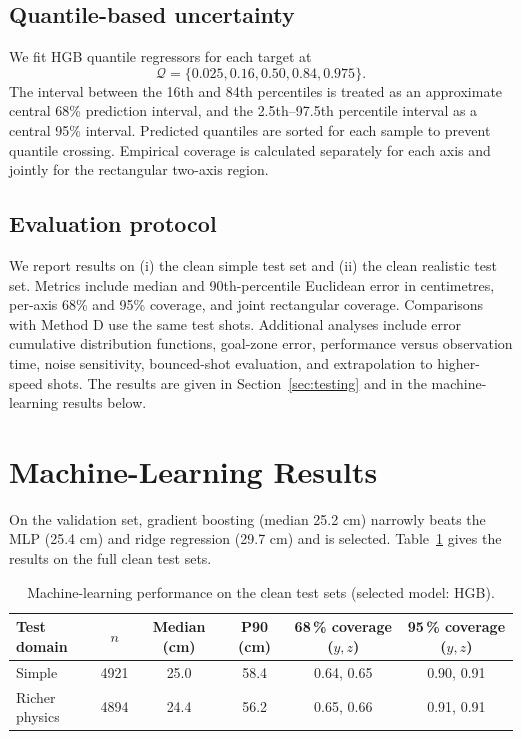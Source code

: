 \documentclass[11pt,a4paper]{article}
\begin{document}
\subsection{Quantile-based uncertainty}
We fit HGB quantile regressors for each target at
\begin{equation}
    \mathcal Q=\{0.025,0.16,0.50,0.84,0.975\}.
\end{equation}
The interval between the 16th and 84th percentiles is treated as an approximate central 68\% prediction interval, and the 2.5th--97.5th percentile interval as a central 95\% interval. Predicted quantiles are sorted for each sample to prevent quantile crossing. Empirical coverage is calculated separately for each axis and jointly for the rectangular two-axis region.

\subsection{Evaluation protocol}
We report results on (i) the clean simple test set and (ii) the clean realistic test set. Metrics include median and 90th-percentile Euclidean error in centimetres, per-axis 68\% and 95\% coverage, and joint rectangular coverage. Comparisons with Method D use the same test shots. Additional analyses include error cumulative distribution functions, goal-zone error, performance versus observation time, noise sensitivity, bounced-shot evaluation, and extrapolation to higher-speed shots. The results are given in Section~\ref{sec:testing} and in the machine-learning results below.

\section{Machine-Learning Results}
On the validation set, gradient boosting (median 25.2 cm) narrowly beats the MLP (25.4 cm) and ridge regression (29.7 cm) and is selected. Table~\ref{tab:mlresults} gives the results on the full clean test sets.

\begin{table}[H]
\centering
\caption{Machine-learning performance on the clean test sets (selected model: HGB).}
\label{tab:mlresults}
\small
\begin{tabular}{@{}lccccc@{}}
\toprule
Test domain & $n$ & Median (cm) & P90 (cm) & 68\,\% coverage ($y,z$) & 95\,\% coverage ($y,z$)\\
\midrule
Simple & 4921 & 25.0 & 58.4 & 0.64, 0.65 & 0.90, 0.91\\
Richer physics & 4894 & 24.4 & 56.2 & 0.65, 0.66 & 0.91, 0.91\\
\bottomrule
\end{tabular}
\end{table}
\end{document}
